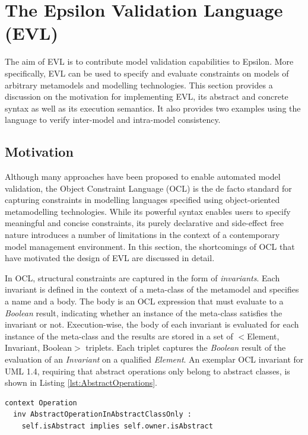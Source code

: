 \chapter{The Epsilon Validation Language (EVL)}
\label{sec:EVL}

The aim of EVL is to contribute model validation capabilities to Epsilon. More specifically, EVL can be used to specify and evaluate constraints on models of arbitrary metamodels and modelling technologies. This section provides a discussion on the motivation for implementing EVL, its abstract and concrete syntax as well as its execution semantics. It also provides two examples using the language to verify inter-model and intra-model consistency.

\section{Motivation}
\label{sec:OCL.Limitations}

Although many approaches have been proposed to enable automated model validation, the Object Constraint Language (OCL) \cite{OCL} is the de facto standard for capturing constraints in modelling languages specified using object-oriented metamodelling technologies. While its powerful syntax enables users to specify meaningful and concise constraints, its purely declarative and side-effect free nature introduces a number of limitations in the context of a contemporary model management environment. In this section, the shortcomings of OCL that have motivated the design of EVL are discussed in detail.

In OCL, structural constraints are captured in the form of \textit{invariants}. Each invariant is defined in the context of a meta-class of the metamodel and specifies a name and a body. The body is an OCL expression that must evaluate to a \emph{Boolean} result, indicating whether an instance of the meta-class satisfies the invariant or not. Execution-wise, the body of each invariant is evaluated for each instance of the meta-class and the results are stored in a set of $<$Element, Invariant, Boolean$>$ triplets. Each triplet captures the \emph{Boolean} result of the evaluation of an \emph{Invariant} on a qualified \emph{Element}. An exemplar OCL invariant for UML 1.4, requiring that abstract operations only belong to abstract classes, is shown in Listing \ref{lst:AbstractOperations}.

\begin{lstlisting}[basicstyle=\ttfamily\footnotesize, flexiblecolumns=true, numbers=none, nolol=true, caption=OCL constraint on UML operations, label=lst:AbstractOperations, language=OCL]
context Operation
  inv AbstractOperationInAbstractClassOnly :
    self.isAbstract implies self.owner.isAbstract
\end{lstlisting}

